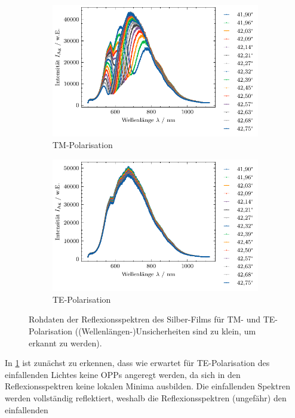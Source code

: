 \begin{figure}[H]
    \centering
    \begin{subfigure}{0.45\textwidth}
        \centering
        \includegraphics[width=\linewidth]{../figs/silber_tm}
        \caption{TM-Polarisation}
    \end{subfigure}
    \begin{subfigure}{0.45\textwidth}
        \centering
        \includegraphics[width=\linewidth]{../figs/silber_te}
        \caption{TE-Polarisation}
    \end{subfigure}
    \caption{Rohdaten der Reflexionsspektren des Silber-Films für TM- und TE-Polarisation ((Wellenlängen-)Unsicherheiten sind zu klein, um erkannt zu werden).}\label{fig:silber_rohdaten}
\end{figure} In \cref{fig:silber_rohdaten} ist zunächst zu erkennen, dass wie erwartet für TE-Polarisation des einfallenden Lichtes keine OPPs angeregt werden, da sich in
den Reflexionsspektren keine lokalen Minima ausbilden. Die einfallenden Spektren werden vollständig reflektiert, weshalb die Reflexionsspektren (ungefähr) den einfallenden
